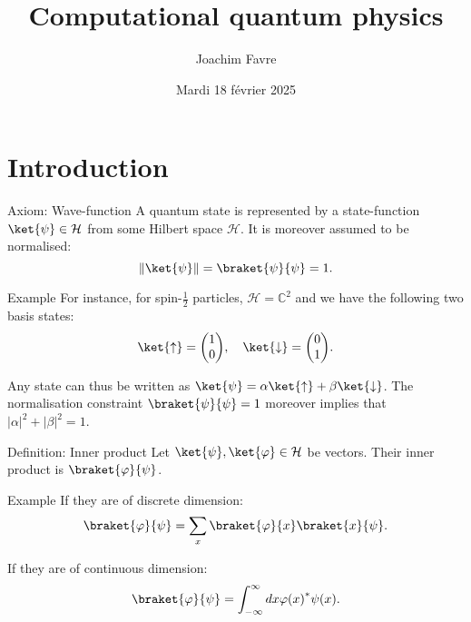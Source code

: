 \documentclass[a4paper]{article}
\title{Computational quantum physics}
\author{Joachim Favre}
\date{Mardi 18 février 2025}
\begin{document}
\maketitle


\section{Introduction}

\begin{parag}{Axiom: Wave-function}
    A quantum state is represented by a state-function $\ket{\psi} \in \mathcal{H}$ from some Hilbert space $\mathcal{H}$. It is moreover assumed to be normalised: 
    \[\left\|\ket{\psi}\right\| = \braket{\psi}{\psi} = 1.\]

    \begin{subparag}{Example}
        For instance, for spin-$\frac{1}{2}$ particles, $\mathcal{H} = \mathbb{C}^2$ and we have the following two basis states: 
        \[\ket{\uparrow} = \begin{pmatrix} 1 \\ 0 \end{pmatrix}, \mathspace \ket{\downarrow} = \begin{pmatrix} 0 \\ 1 \end{pmatrix}.\]
        
        Any state can thus be written as $\ket{\psi} = \alpha \ket{\uparrow} + \beta \ket{\downarrow}$. The normalisation constraint $\braket{\psi}{\psi} = 1$ moreover implies that $\left|\alpha\right|^2 + \left|\beta\right|^2 = 1$.
    \end{subparag}
\end{parag}

\begin{parag}{Definition: Inner product}
    Let $\ket{\psi}, \ket{\phi} \in \mathcal{H}$ be vectors. Their inner product is $\braket{\phi}{\psi}$. 

    \begin{subparag}{Example}
        If they are of discrete dimension: 
        \[\braket{\phi}{\psi} = \sum_{x} \braket{\phi}{x} \braket{x}{\psi}.\]

        If they are of continuous dimension: 
        \[\braket{\phi}{\psi} = \int_{-\infty}^{\infty} dx \phi\left(x\right)^* \psi\left(x\right).\]
    \end{subparag}
\end{parag}
\end{document}
